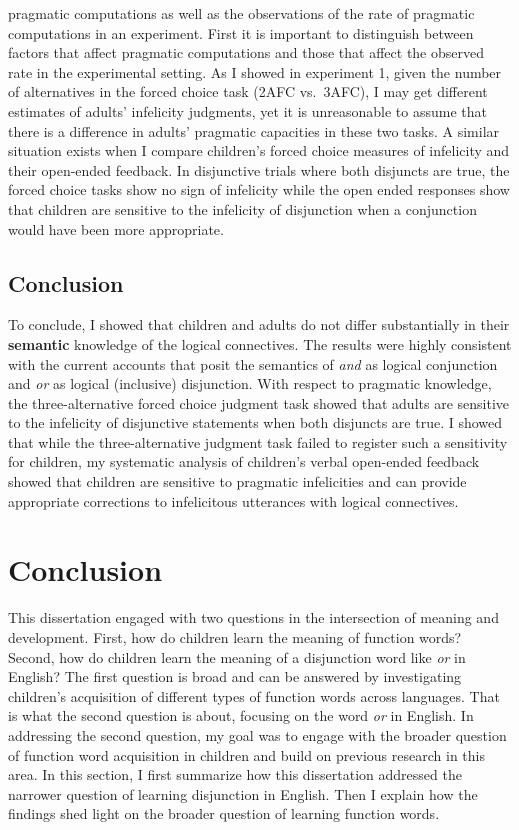 \documentclass[oneside]{report}
\theoremstyle{definition}
\theoremstyle{definition}
\theoremstyle{definition}
\theoremstyle{remark}
\begin{document}
pragmatic computations as well as the observations of the rate of
pragmatic computations in an experiment. First it is important to
distinguish between factors that affect pragmatic computations and those
that affect the observed rate in the experimental setting. As I showed
in experiment 1, given the number of alternatives in the forced choice
task (2AFC vs.~3AFC), I may get different estimates of adults'
infelicity judgments, yet it is unreasonable to assume that there is a
difference in adults' pragmatic capacities in these two tasks. A similar
situation exists when I compare children's forced choice measures of
infelicity and their open-ended feedback. In disjunctive trials where
both disjuncts are true, the forced choice tasks show no sign of
infelicity while the open ended responses show that children are
sensitive to the infelicity of disjunction when a conjunction would have
been more appropriate.

\section{Conclusion}\label{conclusion-2}

To conclude, I showed that children and adults do not differ
substantially in their \textbf{semantic} knowledge of the logical
connectives. The results were highly consistent with the current
accounts that posit the semantics of \emph{and} as logical conjunction
and \emph{or} as logical (inclusive) disjunction. With respect to
pragmatic knowledge, the three-alternative forced choice judgment task
showed that adults are sensitive to the infelicity of disjunctive
statements when both disjuncts are true. I showed that while the
three-alternative judgment task failed to register such a sensitivity
for children, my systematic analysis of children's verbal open-ended
feedback showed that children are sensitive to pragmatic infelicities
and can provide appropriate corrections to infelicitous utterances with
logical connectives.

\chapter{Conclusion}\label{conclusion}

This dissertation engaged with two questions in the intersection of
meaning and development. First, how do children learn the meaning of
function words? Second, how do children learn the meaning of a
disjunction word like \emph{or} in English? The first question is broad
and can be answered by investigating children's acquisition of different
types of function words across languages. That is what the second
question is about, focusing on the word \emph{or} in English. In
addressing the second question, my goal was to engage with the broader
question of function word acquisition in children and build on previous
research in this area. In this section, I first summarize how this
dissertation addressed the narrower question of learning disjunction in
English. Then I explain how the findings shed light on the broader
question of learning function words.
\end{document}
